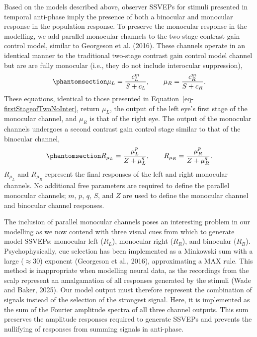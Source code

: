 \documentclass[
  12pt,
]{article}
\begin{document}
Based on the models described above, observer SSVEPs for stimuli
presented in temporal anti-phase imply the presence of both a binocular
and monocular response in the population response. To preserve the
monocular response in the modelling, we add parallel monocular channels
to the two-stage contrast gain control model, similar to Georgeson et
al. (2016). These channels operate in an identical manner to the
traditional two-stage contrast gain control model channel but are are
fully monocular (i.e., they do not include interocular suppression),
\begin{equation}\phantomsection\label{eq-monocFirstStage}{
\mu_L = \frac{c_L^m}{S + c_L}, \qquad  \mu_R = \frac{c_R^m}{S + c_R}.
}\end{equation} These equations, identical to those presented in
Equation~\ref{eq-firstStageofTwoNoInter}, return \(\mu_L\), the output
of the left eye's first stage of the monocular channel, and \(\mu_R\) is
that of the right eye. The output of the monocular channels undergoes a
second contrast gain control stage similar to that of the binocular
channel, \begin{equation}\phantomsection\label{eq-monocSecondStage}{
R_{\mu_L} = \frac{\mu_L^p}{Z + \mu_L^q}, \qquad  R_{\mu_R} = \frac{\mu_R^p}{Z + \mu_R^q}.
}\end{equation} \(R_{\mu_L}\) and \(R_{\mu_R}\) represent the final
responses of the left and right monocular channels. No additional free
parameters are required to define the parallel monocular channels;
\(m\), \(p\), \(q\), \(S\), and \(Z\) are used to define the monocular
channel and binocular channel responses.

The inclusion of parallel monocular channels poses an interesting
problem in our modelling as we now contend with three visual cues from
which to generate model SSVEPs: monocular left (\(R_L\)), monocular
right (\(R_R\)), and binocular (\(R_B\)). Psychophysically, cue
selection has been implemented as a Minkowski sum with a large
(\(\approx 30\)) exponent (Georgeson et al., 2016), approximating a MAX
rule. This method is inappropriate when modelling neural data, as the
recordings from the scalp represent an amalgamation of all responses
generated by the stimuli (Wade and Baker, 2025). Our model output must
therefore represent the combination of signals instead of the selection
of the strongest signal. Here, it is implemented as the sum of the
Fourier amplitude spectra of all three channel outputs. This sum
preserves the amplitude responses required to generate SSVEPs and
prevents the nullifying of responses from summing signals in anti-phase.
\end{document}
